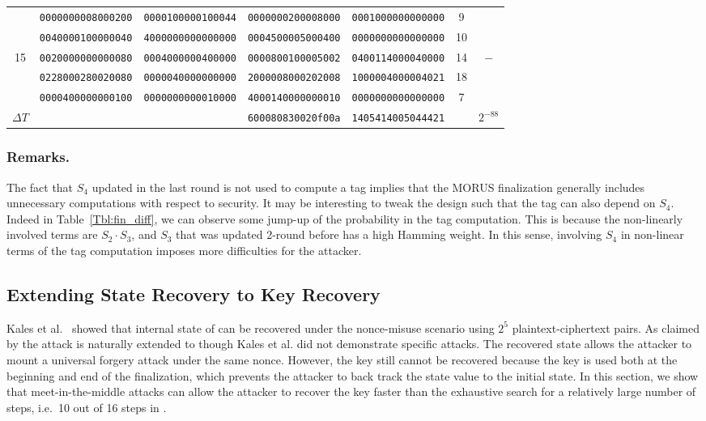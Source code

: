 \begin{table}[!tb]
\begin{center}
{\begin{tabular}{ccccccc}
      & {\tt 0000000008000200} & {\tt 0000100000100044} & {\tt 0000000200008000} & {\tt 0001000000000000} & 9  & \\
      & {\tt 0040000100000040} & {\tt 4000000000000000} & {\tt 0004500005000400} & {\tt 0000000000000000} & 10 & \\
15    & {\tt 0020000000000080} & {\tt 0004000000400000} & {\tt 0000800100005002} & {\tt 0400114000040000} & 14 & $-$\\
      & {\tt 0228000280020080} & {\tt 0000040000000000} & {\tt 2000008000202008} & {\tt 1000004000004021} & 18 & \\
      & {\tt 0000400000000100} & {\tt 0000000000010000} & {\tt 4000140000000010} & {\tt 0000000000000000} & 7  & \\ \hline

$\Delta T$ &                   &                        & {\tt 600080830020f00a} & {\tt 1405414005044421} & & $2^{-88}$ \\ \hline
\end{tabular}
}
\end{center}
\end{table}

\subsubsection{Remarks.} The fact that $S_4$ updated in the last round is not used to compute a tag implies that the MORUS finalization generally includes unnecessary computations with respect to security. It may be interesting to tweak the design such that the tag can also depend on $S_4$. Indeed in Table~\ref{Tbl:fin_diff}, we can observe some jump-up of the probability in the tag computation. This is because the non-linearly involved terms are $S_2 \cdot S_3$, and $S_3$ that was updated 2-round before has a high Hamming weight. In this sense, involving $S_4$ in non-linear terms of the tag computation imposes more difficulties for the attacker.




\subsection{Extending State Recovery to Key Recovery}
\label{subsec/Ini}
Kales et al.~\cite{cryptoeprint:2017:1137} showed that internal state of  can be recovered under the nonce-misuse scenario using $2^5$ plaintext-ciphertext pairs. As claimed by \cite{cryptoeprint:2017:1137} the attack is naturally extended to  though Kales et al. \cite{cryptoeprint:2017:1137} did not demonstrate specific attacks. The recovered state allows the attacker to mount a universal forgery attack under the same nonce. However, the key still cannot be recovered because the key is used both at the beginning and end of the finalization, which prevents the attacker to back track the state value to the initial state. In this section, we show that meet-in-the-middle attacks can allow the attacker to recover the key faster than the exhaustive search for a relatively large number of steps, i.e.~10 out of 16 steps in . 

